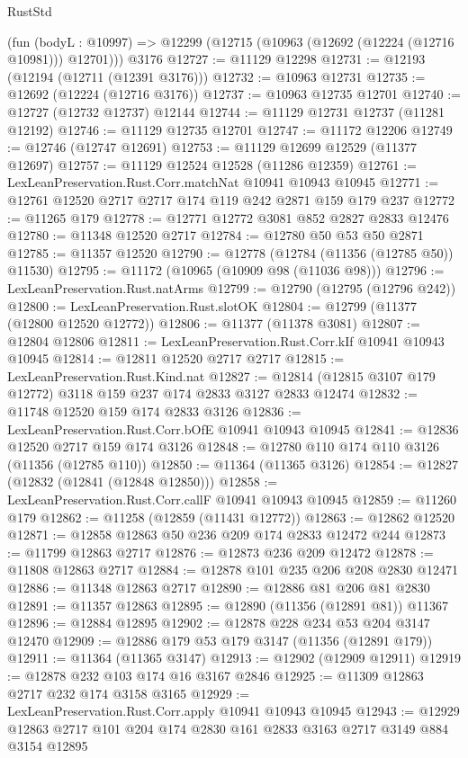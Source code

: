 \begin{lexlean}{RustStd}
\begin{coremodule}
{\begin{coremodule}
{{{{{{{{{{{{{{{{{{{{{{{{{{{{{{{{{    (fun (bodyL : @10997) => @12299 (@12715 (@10963 (@12692 (@12224 (@12716 @10981))) @12701)))
    @3176
@12727 := @11129 @12298
@12731 := @12193 (@12194 (@12711 (@12391 @3176)))
@12732 := @10963 @12731
@12735 := @12692 (@12224 (@12716 @3176))
@12737 := @10963 @12735 @12701
@12740 := @12727 (@12732 @12737) @12144
@12744 := @11129 @12731 @12737 (@11281 @12192)
@12746 := @11129 @12735 @12701
@12747 := @11172 @12206
@12749 := @12746 (@12747 @12691)
@12753 := @11129 @12699 @12529 (@11377 @12697)
@12757 := @11129 @12524 @12528 (@11286 @12359)
@12761 := LexLeanPreservation.Rust.Corr.matchNat @10941 @10943 @10945
@12771 := @12761 @12520 @2717 @2717 @174 @119 @242 @2871 @159 @179 @237
@12772 := @11265 @179
@12778 := @12771 @12772 @3081 @852 @2827 @2833 @12476
@12780 := @11348 @12520 @2717
@12784 := @12780 @50 @53 @50 @2871
@12785 := @11357 @12520
@12790 := @12778 (@12784 (@11356 (@12785 @50)) @11530)
@12795 := @11172 (@10965 (@10909 @98 (@11036 @98)))
@12796 := LexLeanPreservation.Rust.natArms
@12799 := @12790 (@12795 (@12796 @242))
@12800 := LexLeanPreservation.Rust.slotOK
@12804 := @12799 (@11377 (@12800 @12520 @12772))
@12806 := @11377 (@11378 @3081)
@12807 := @12804 @12806
@12811 := LexLeanPreservation.Rust.Corr.kIf @10941 @10943 @10945
@12814 := @12811 @12520 @2717 @2717
@12815 := LexLeanPreservation.Rust.Kind.nat
@12827 := @12814 (@12815 @3107 @179 @12772) @3118 @159 @237 @174 @2833 @3127 @2833 @12474
@12832 := @11748 @12520 @159 @174 @2833 @3126
@12836 := LexLeanPreservation.Rust.Corr.bOfE @10941 @10943 @10945
@12841 := @12836 @12520 @2717 @159 @174 @3126
@12848 := @12780 @110 @174 @110 @3126 (@11356 (@12785 @110))
@12850 := @11364 (@11365 @3126)
@12854 := @12827 (@12832 (@12841 (@12848 @12850)))
@12858 := LexLeanPreservation.Rust.Corr.callF @10941 @10943 @10945
@12859 := @11260 @179
@12862 := @11258 (@12859 (@11431 @12772))
@12863 := @12862 @12520
@12871 := @12858 @12863 @50 @236 @209 @174 @2833 @12472 @244
@12873 := @11799 @12863 @2717
@12876 := @12873 @236 @209 @12472
@12878 := @11808 @12863 @2717
@12884 := @12878 @101 @235 @206 @208 @2830 @12471
@12886 := @11348 @12863 @2717
@12890 := @12886 @81 @206 @81 @2830
@12891 := @11357 @12863
@12895 := @12890 (@11356 (@12891 @81)) @11367
@12896 := @12884 @12895
@12902 := @12878 @228 @234 @53 @204 @3147 @12470
@12909 := @12886 @179 @53 @179 @3147 (@11356 (@12891 @179))
@12911 := @11364 (@11365 @3147)
@12913 := @12902 (@12909 @12911)
@12919 := @12878 @232 @103 @174 @16 @3167 @2846
@12925 := @11309 @12863 @2717 @232 @174 @3158 @3165
@12929 := LexLeanPreservation.Rust.Corr.apply @10941 @10943 @10945
@12943 := @12929 @12863 @2717 @101 @204 @174 @2830 @161 @2833 @3163 @2717 @3149 @884 @3154 @12895
}}}}}}}}}}}}}}}}}}}}}}}}}}}}}}}}}
\end{coremodule}}
\end{coremodule}
\end{lexlean}
